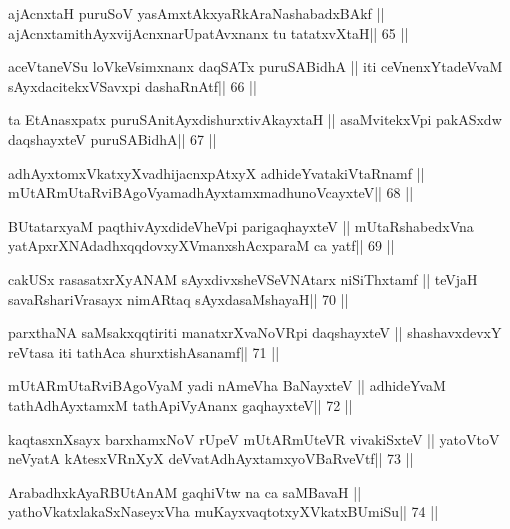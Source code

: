 \begin{shl}
ajAcnxtaH puruSoV yasAmxtAkxyaRkAraNashabadxBAkf ||
ajAcnxtamithAyxvijAcnxnarUpatAvxnanx tu tatatxvXtaH\hfill || 65 ||
\end{shl}

\begin{shl}
aceVtaneVSu loVkeV\s simxnanx daqSATx puruSABidhA ||
iti ceVnenxYtadeVvaM sAyxdacitekxVSavxpi dashaRnAtf\hfill || 66 ||
\end{shl}

\begin{shl}
ta EtAnasxpatx puruSAnitAyxdishurxtivAkayxtaH ||
asaMvitekxV\s pi pakASxdw daqshayxteV puruSABidhA\hfill || 67 ||
\end{shl}

\begin{shl}
adhAyxtomxVkatxyXvadhijacnxpAtxyX adhideYvatakiVtaRnamf ||
mUtARmUtaRviBAgoV\s yamadhAyxtamxmadhunoVcayxteV\hfill || 68 ||
\end{shl}

\begin{shl}
BUtatarxyaM paqthivAyxdi\s deVheV\s pi parigaqhayxteV ||
mUtaRshabedxVna yatApxrXNAdadhxqqdovxyXVmanxshAcxparaM ca yatf\hfill || 69 ||
\end{shl}

\begin{shl}
cakUSx rasasatxrXyANAM sAyxdivxsheVSeVNAtarx niSiThxtamf ||
teVjaH savaRshariVrasayx nimARtaq sAyxdasaMshayaH\hfill || 70 ||
\end{shl}

\begin{shl}
parxthaNA saMsakxqqtiriti manatxrXvaNoVR\s pi daqshayxteV ||
shashavxdevxY reVtasa iti tathAca shurxtishAsanamf\hfill || 71 ||
\end{shl}

\begin{shl}
mUtARmUtaRviBAgoV\s yaM yadi nAmeVha BaNayxteV ||
adhideYvaM tathA\s dhAyxtamxM tathA\s piVyAnanx gaqhayxteV\hfill || 72 ||
\end{shl}

\begin{shl}
kaqtasxnXsayx barxhamxNoV rUpeV mUtARmUteVR vivakiSxteV ||
yatoV\s toV neVyatA kAtesxVRnXyX deVvatAdhAyxtamxyoVBaRveVtf\hfill || 73 ||
\end{shl}

\begin{shl}
ArabadhxkAyaRBUtAnAM gaqhiVtw na ca saMBavaH ||
yathoVkatxlakaSxNaseyxVha muKayxvaqtotxyXVkatxBUmiSu\hfill || 74 ||
\end{shl}

